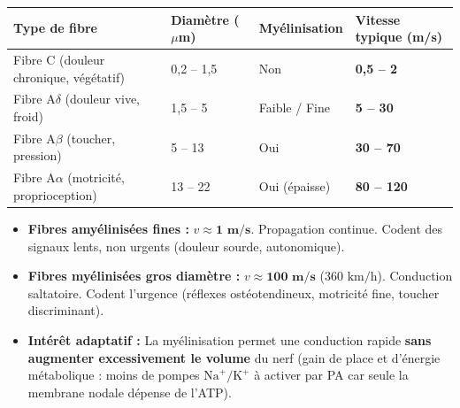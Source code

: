 \documentclass[11pt]{article}
\begin{document}
\begin{center}
\begin{tabularx}{\linewidth}{|l|X|X|X|}
\hline
\rowcolor{popblueL}
\textbf{Type de fibre} & \textbf{Diamètre ($\mu$m)} & \textbf{Myélinisation} & \textbf{Vitesse typique (m/s)} \\
\hline
Fibre C (douleur chronique, végétatif) & 0,2 -- 1,5 & Non & \textbf{0,5 -- 2} \\
Fibre A$\delta$ (douleur vive, froid) & 1,5 -- 5 & Faible / Fine & \textbf{5 -- 30} \\
Fibre A$\beta$ (toucher, pression) & 5 -- 13 & Oui & \textbf{30 -- 70} \\
Fibre A$\alpha$ (motricité, proprioception) & 13 -- 22 & Oui (épaisse) & \textbf{80 -- 120} \\
\hline
\end{tabularx}
\end{center}

\begin{aretenir}
\begin{itemize}
    \item \textbf{Fibres amyélinisées fines :} $v \approx \mathbf{1 \text{ m/s}}$. Propagation continue. Codent des signaux lents, non urgents (douleur sourde, autonomique).
    \item \textbf{Fibres myélinisées gros diamètre :} $v \approx \mathbf{100 \text{ m/s}}$ ($360 \text{ km/h}$). Conduction saltatoire. Codent l'urgence (réflexes ostéotendineux, motricité fine, toucher discriminant).
    \item \textbf{Intérêt adaptatif :} La myélinisation permet une conduction rapide \textbf{sans augmenter excessivement le volume} du nerf (gain de place et d'énergie métabolique : moins de pompes $\text{Na}^+/\text{K}^+$ à activer par PA car seule la membrane nodale dépense de l'ATP).
\end{itemize}
\end{aretenir}
\end{document}
